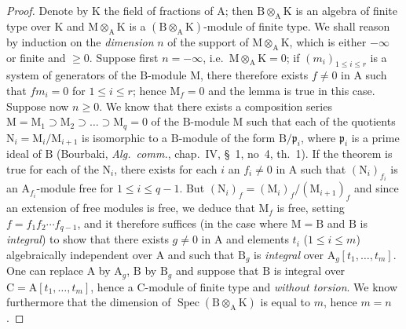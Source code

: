 \begin{proof}
Denote by $\mathrm{K}$ the field of fractions of $\mathrm{A}$; then $\mathrm{B}\otimes_\mathrm{A}\mathrm{K}$ is an algebra of finite type over $\mathrm{K}$ and $\mathrm{M}\otimes_\mathrm{A}\mathrm{K}$ is a $(\mathrm{B}\otimes_\mathrm{A}\mathrm{K})$-module of finite type. We shall reason by induction on the \emph{dimension} $n$ of the support of $\mathrm{M}\otimes_\mathrm{A}\mathrm{K}$, which is either $-\infty$ or finite and $\geqslant 0$. Suppose first $n=-\infty$, i.e.\ $\mathrm{M}\otimes_\mathrm{A}\mathrm{K}=0$; if $(m_i)_{1\leqslant i\leqslant r}$ is a system of generators of the $\mathrm{B}$-module $\mathrm{M}$, there therefore exists $f\neq 0$ in $\mathrm{A}$ such that $fm_i=0$ for $1\leqslant i\leqslant r$; hence $\mathrm{M}_f=0$ and the lemma is true in this case. Suppose now $n\geqslant 0$. We know that there exists a composition series $\mathrm{M}=\mathrm{M}_1\supset\mathrm{M}_2\supset\ldots\supset\mathrm{M}_q=0$ of the $\mathrm{B}$-module $\mathrm{M}$ such that each of the quotients $\mathrm{N}_i=\mathrm{M}_i/\mathrm{M}_{i+1}$ is isomorphic to a $\mathrm{B}$-module of the form $\mathrm{B}/\mathfrak{p}_i$, where $\mathfrak{p}_i$ is a prime ideal of $\mathrm{B}$ (Bourbaki, \emph{Alg.\ comm.}, chap.~IV, \S~1, no~4, th.~1). If the theorem is true for each of the $\mathrm{N}_i$, there exists for each $i$ an $f_i\neq 0$ in $\mathrm{A}$ such that $(\mathrm{N}_i)_{f_i}$ is an $\mathrm{A}_{f_i}$-module free for $1\leqslant i\leqslant q-1$. But $(\mathrm{N}_i)_f=(\mathrm{M}_i)_f/(\mathrm{M}_{i+1})_f$  and since an extension of free modules is free, we deduce that $\mathrm{M}_f$ is free, setting $f=f_1f_2\cdots f_{q-1}$, and it therefore suffices (in the case where $\mathrm{M}=\mathrm{B}$ and $\mathrm{B}$ is \emph{integral}) to show that there exists $g\neq 0$ in $\mathrm{A}$ and elements $t_i$ ($1\leqslant i\leqslant m$) algebraically independent over $\mathrm{A}$ and such that $\mathrm{B}_g$ is \emph{integral} over $\mathrm{A}_g[t_1,\ldots,t_m]$. One can replace $\mathrm{A}$ by $\mathrm{A}_g$, $\mathrm{B}$ by $\mathrm{B}_g$ and suppose that $\mathrm{B}$ is integral over $\mathrm{C}=\mathrm{A}[t_1,\ldots,t_m]$, hence a $\mathrm{C}$-module of finite type and \emph{without torsion}. We know furthermore  that the dimension of $\operatorname{Spec}(\mathrm{B}\otimes_\mathrm{A}\mathrm{K})$ is equal to $m$, hence $m=n$.


\end{proof}
